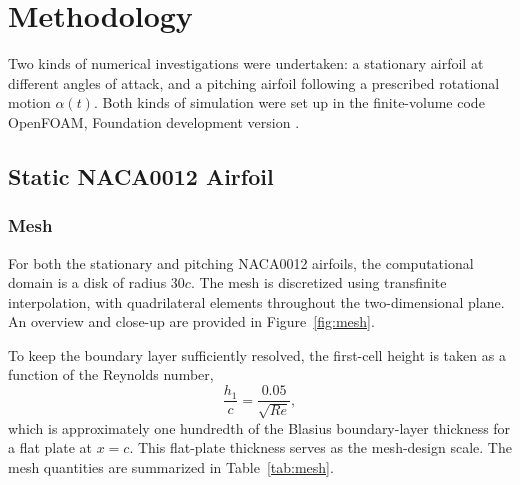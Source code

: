 \section{Methodology}
Two kinds of numerical investigations were undertaken: a stationary airfoil at different angles of attack, and a pitching airfoil following a prescribed rotational motion $\alpha(t)$. Both kinds of simulation were set up in the finite-volume code OpenFOAM, Foundation development version \cite{weller}.

\subsection{Static NACA0012 Airfoil}
\subsubsection{Mesh}
For both the stationary and pitching NACA0012 airfoils, the computational domain is a disk of radius $30c$. The mesh is discretized using transfinite interpolation, with quadrilateral elements throughout the two-dimensional plane. An overview and close-up are provided in Figure~\ref{fig:mesh}.


To keep the boundary layer sufficiently resolved, the first-cell height is taken as a function of the Reynolds number,
\begin{equation}
\frac{h_1}{c}=\frac{0.05}{\sqrt{Re}},
\end{equation}
which is approximately one hundredth of the Blasius boundary-layer thickness for a flat plate at $x=c$. This flat-plate thickness serves as the mesh-design scale. The mesh quantities are summarized in Table~\ref{tab:mesh}.

